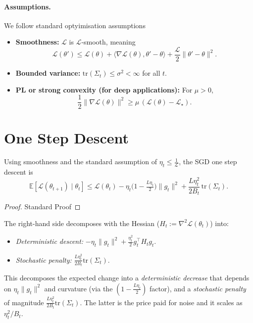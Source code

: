\documentclass[12pt]{article}
\begin{document}
\paragraph{Assumptions.} We follow standard optyimisation assumptions
\begin{itemize}
\item \textbf{Smoothness:} $\mathcal{L}$ is $\mathcal{L}$-smooth, meaning 
\[
\mathcal{L}(\theta') \le \mathcal{L}(\theta) + \langle \nabla \mathcal{L}(\theta), \theta'-\theta\rangle + \frac{\mathcal{L}}{2}\|\theta'-\theta\|^2.
\]
\item \textbf{Bounded variance:} $\mathrm{tr}(\Sigma_t)\le \sigma^2 < \infty$ for all $t$.
\item \textbf{PL or strong convexity (for deep applications):} For $\mu>0$, 
\[
\frac{1}{2}\|\nabla \mathcal{L}(\theta)\|^2 \ge \mu\,(\mathcal{L}(\theta)-\mathcal{L}_\star).
\]
\end{itemize}

\section{One Step Descent}
Using smoothness and the standard assumption of $\eta_t \le \tfrac{1}{\mathcal{L}}$, the SGD one step descent is
\[
\mathbb{E}[\mathcal{L}(\theta_{t+1}) \mid \theta_t] 
\le \mathcal{L}(\theta_t) - \eta_t\Big(1 - \tfrac{L\eta_t}{2}\Big)\|g_t\|^2 
+ \frac{L\eta_t^2}{2B_t}\,\mathrm{tr}(\Sigma_t).
\]
\begin{proof}
Standard Proof
\end{proof}

\noindent The right-hand side decomposes with the Hessian ($H_t := \nabla^2 \mathcal{L}( \theta_t )$) into:
\begin{itemize}
\item \emph{Deterministic descent:} $-\eta_t\|g_t\|^2 + \tfrac{\eta_t^2}{2} g_t^\top H_t g_t$.
\item \emph{Stochastic penalty:} $\tfrac{L\eta_t^2}{2B_t}\mathrm{tr}(\Sigma_t)$.
\end{itemize}
This decomposes the expected change into a \emph{deterministic decrease} that depends on $\eta_t\|g_t\|^2$ and curvature (via the $(1-\tfrac{L\eta_t}{2})$ factor), and a \emph{stochastic penalty} of magnitude $\tfrac{L\eta_t^2}{2B_t}\mathrm{tr}(\Sigma_t)$. The latter is the price paid for noise and it scales as $\eta_t^2/B_t$.
\end{document}

